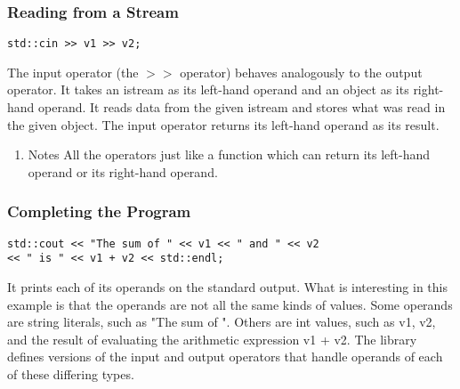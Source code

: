 \documentclass[11pt]{article}
\begin{document}
\subsubsection{Reading from a Stream}
\label{sec-1-2-5}
\begin{verbatim}
std::cin >> v1 >> v2;
\end{verbatim}
The input operator (the $>>$ operator) behaves analogously to the output operator.
It takes an istream as its left-hand operand and an object as its
right-hand operand.
It reads data from the given istream and stores what was read in the given object. 
The input operator returns its left-hand operand as its result.
\begin{enumerate}
\item Notes
\label{sec-1-2-5-1}
All the operators just like a function which can return its left-hand operand or its 
right-hand operand.
\end{enumerate}
\subsubsection{Completing the Program}
\label{sec-1-2-6}
\begin{verbatim}
std::cout << "The sum of " << v1 << " and " << v2 
<< " is " << v1 + v2 << std::endl;
\end{verbatim}
It prints each of its operands on the standard output.
What is interesting in this example is that the operands are not all the same kinds of values. 
Some operands are string literals, such as "The sum of ". 
Others are int values, such as v1, v2, 
and the result of evaluating the arithmetic expression v1 + v2. 
The library defines versions of the input and output 
operators that handle operands of each of these differing types.
\end{document}
